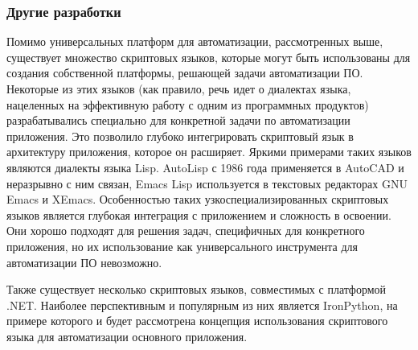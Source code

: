 \subsubsection{Другие разработки}

Помимо универсальных платформ для автоматизации, рассмотренных выше, существует множество скриптовых языков, которые могут быть использованы для создания собственной платформы, решающей задачи автоматизации ПО. Некоторые из этих языков (как правило, речь идет о диалектах языка, нацеленных на эффективную работу с одним из программных продуктов) разрабатывались специально для конкретной задачи по автоматизации приложения. Это позволило глубоко интегрировать скриптовый язык в архитектуру приложения, которое он расширяет. Яркими примерами таких языков являются диалекты языка Lisp. AutoLisp с 1986 года применяется в AutoCAD и неразрывно с ним связан, Emacs Lisp используется в текстовых редакторах GNU Emacs и XEmacs. Особенностью таких узкоспециализированных скриптовых языков является глубокая интеграция с приложением и сложность в освоении. Они хорошо подходят для решения задач, специфичных для конкретного приложения, но их использование как универсального инструмента для автоматизации ПО невозможно.

Также существует несколько скриптовых языков, совместимых с платформой .NET. Наиболее перспективным и популярным из них является IronPython, на примере которого и будет рассмотрена концепция использования скриптового языка для автоматизации основного приложения.


